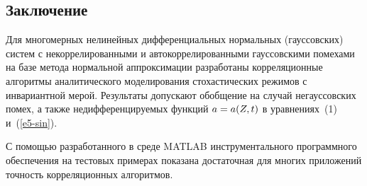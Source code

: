 \begin{multicols}{2}
\section{Заключение}
  
  Для многомерных нелинейных дифференциальных нормальных 
(гауссовских) сис\-тем с некоррелированными и автокоррелированными 
гауссовскими помехами на базе метода нормальной аппроксима\-ции 
разработаны корреляционные ал\-го\-рит\-мы аналитического моделирования 
стохастических режимов с инвариантной мерой. Результаты допускают 
обобщение на случай негауссовских помех, а также недифференцируемых 
функций $a\hm=a(Z,t)$ в урав\-не\-ни\-ях~(1) и~(\ref{e5-sin}).
  
  С помощью разработанного в среде MATLAB инструментального 
программного обеспечения на тестовых примерах показана достаточная для 
многих приложений точность корреляционных ал\-го\-ритмов.
  
  
  {\small\frenchspacing
{%
\begin{thebibliography}{99}


\end{thebibliography}}}
\end{multicols}
